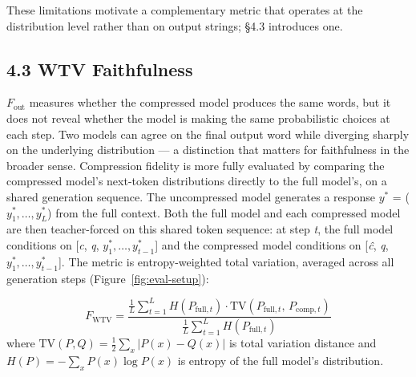 \documentclass[10pt,letterpaper]{article}
\begin{document}
These limitations motivate a complementary metric that operates at the distribution
level rather than on output strings; §4.3 introduces one.


\hypertarget{kl-faithfulness}{%
\subsection{4.3 WTV Faithfulness}\label{wtv-faithfulness}}

\(F_{\text{out}}\) measures whether the compressed model produces the same words,
but it does not reveal whether the model is making the same probabilistic choices
at each step. Two models can agree on the final output word while diverging sharply
on the underlying distribution — a distinction that matters for faithfulness in the
broader sense. Compression fidelity is more fully evaluated by comparing the compressed
model's next-token distributions directly to the full model's, on a shared generation sequence.
The uncompressed model generates a response \(y^*\)
= (\(y^*_1, \ldots, y^*_L\)) from the full context. Both the full model
and each compressed model are then teacher-forced on this shared token
sequence: at step \emph{t}, the full model conditions on {[}\emph{c},
\emph{q}, \(y^*_1, \ldots, y^*_{t-1}\){]} and the compressed model
conditions on {[}\emph{ĉ}, \emph{q}, \(y^*_1, \ldots, y^*_{t-1}\){]}.
The metric is entropy-weighted total variation, averaged across all generation steps
(Figure~\ref{fig:eval-setup}):

\[
F_{\text{WTV}} =
  \frac{\displaystyle\frac{1}{L}\sum_{t=1}^{L}
    H\!\left(P_{\text{full},t}\right)\cdot
    \mathrm{TV}\!\left(P_{\text{full},t},\, P_{\text{comp},t}\right)}%
  {\displaystyle\frac{1}{L}\sum_{t=1}^{L}
    H\!\left(P_{\text{full},t}\right)}
\]
where \(\mathrm{TV}(P,Q)=\tfrac{1}{2}\sum_x|P(x)-Q(x)|\) is total variation distance
and \(H(P)=-\sum_x P(x)\log P(x)\) is entropy of the full model's distribution.
\end{document}
